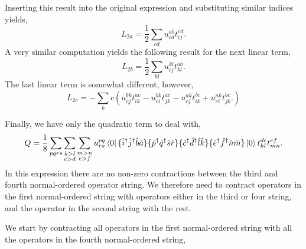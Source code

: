 Inserting this result into the original expression and substituting similar indices
yields,
\begin{equation}
    L_{2a} = \frac{1}{2} \sum_{cd} u^{ab}_{cd} t^{cd}_{ij}.
\end{equation}
A very similar computation yields the following result for the next linear term,
\begin{equation}
    L_{2b} = \frac{1}{2} \sum_{kl} u^{kl}_{ij} t^{ab}_{kl}.
\end{equation}
The last linear term is somewhat different, however,
\begin{equation}
    L_{2c} = - \sum_kc \left( 
         u^{bk}_{cj} t^{ac}_{ik}
       - u^{bk}_{ci} t^{ac}_{jk} 
       - u^{ak}_{cj} t^{bc}_{ik}
       + u^{ak}_{ci} t^{bc}_{jk}. 
    \right)
\end{equation}

Finally, we have only the quadratic term to deal with,
\begin{equation}
    \label{eq:quadratic_term}
    Q = \frac{1}{8}\sum_{pqrs}\sum_{\substack{k>l \\ c>d}} \sum_{\substack{m>n \\ e>f}}
        u^{pq}_{rs} \bra{0}
            \{\hat{i}^\dagger \hat{j}^\dagger \hat{b} \hat{a} \}
            \{\hat{p}^\dagger \hat{q}^\dagger \hat{s} \hat{r} \}
            \{\hat{c}^\dagger \hat{d}^\dagger \hat{l} \hat{k} \}
            \{\hat{e}^\dagger \hat{f}^\dagger \hat{n} \hat{m} \}
        \ket{0} t^{dc}_{kl} t^{ef}_{mn}.
\end{equation}
In this expression there are no non-zero contractions between the third and 
fourth normal-ordered operator string. We therefore need to contract operators 
in the first normal-ordered string with operators either in the third or four 
string, and the operator in the second string with the rest. 

We start by contracting all operators in the first normal-ordered string 
with all the operators in the fourth normal-ordered string,

